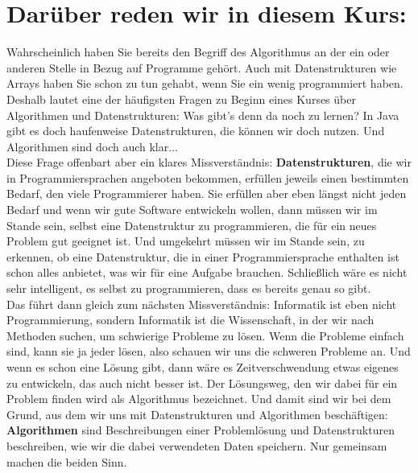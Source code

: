 \section{Darüber reden wir in diesem Kurs:}

Wahrscheinlich haben Sie bereits den Begriff des Algorithmus an der ein oder anderen Stelle in Bezug auf Programme gehört. Auch mit Datenstrukturen wie Arrays haben Sie schon zu tun gehabt, wenn Sie ein wenig programmiert haben. Deshalb lautet eine der häufigsten Fragen zu Beginn eines Kurses über Algorithmen und Datenstrukturen: \glqq{}Was gibt's denn da noch zu lernen? In Java gibt es doch haufenweise Datenstrukturen, die können wir doch nutzen. Und Algorithmen sind doch auch klar...\grqq{}\\

Diese Frage offenbart aber ein klares Missverständnis: \textbf{Datenstrukturen}, die wir in Programmiersprachen angeboten bekommen, erfüllen jeweils einen bestimmten Bedarf, den viele Programmierer haben. Sie erfüllen aber eben längst nicht jeden Bedarf und wenn wir gute Software entwickeln wollen, dann müssen wir im Stande sein, selbst eine Datenstruktur zu programmieren, die für ein neues Problem gut geeignet ist. Und umgekehrt müssen wir im Stande sein, zu erkennen, ob eine Datenstruktur, die in einer Programmiersprache enthalten ist schon alles anbietet, was wir für eine Aufgabe brauchen. Schließlich wäre es nicht sehr intelligent, es selbst zu programmieren, dass es bereits genau so gibt.\\

Das führt dann gleich zum nächsten Missverständnis: Informatik ist eben nicht Programmierung, sondern Informatik ist die Wissenschaft, in der wir nach Methoden suchen, um schwierige Probleme zu lösen. Wenn die Probleme einfach sind, kann sie ja jeder lösen, also schauen wir uns die schweren Probleme an. Und wenn es schon eine Lösung gibt, dann wäre es Zeitverschwendung etwas eigenes zu entwickeln, das auch nicht besser ist. Der Lösungsweg, den wir dabei für ein Problem finden wird als Algorithmus bezeichnet. Und damit sind wir bei dem Grund, aus dem wir uns mit Datenstrukturen und Algorithmen beschäftigen: \textbf{Algorithmen} sind Beschreibungen einer Problemlösung und Datenstrukturen beschreiben, wie wir die dabei verwendeten Daten speichern. Nur gemeinsam machen die beiden Sinn.\\

